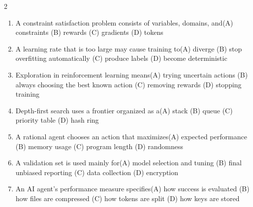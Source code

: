 \documentclass[a4paper]{article}
\begin{document}
\begin{multicols*}{2}
\begin{enumerate}
\item A constraint satisfaction problem consists of variables, domains, and\newline\hspace*{0.6em}(A) constraints \quad (B) rewards \newline\hspace*{0.6em}(C) gradients \quad (D) tokens
\item A learning rate that is too large may cause training to\newline\hspace*{0.6em}(A) diverge \quad (B) stop overfitting automatically \newline\hspace*{0.6em}(C) produce labels \quad (D) become deterministic
\item Exploration in reinforcement learning means\newline\hspace*{0.6em}(A) trying uncertain actions \quad (B) always choosing the best known action \newline\hspace*{0.6em}(C) removing rewards \quad (D) stopping training
\item Depth-first search uses a frontier organized as a\newline\hspace*{0.6em}(A) stack \quad (B) queue \newline\hspace*{0.6em}(C) priority table \quad (D) hash ring
\item A rational agent chooses an action that maximizes\newline\hspace*{0.6em}(A) expected performance \quad (B) memory usage \newline\hspace*{0.6em}(C) program length \quad (D) randomness
\item A validation set is used mainly for\newline\hspace*{0.6em}(A) model selection and tuning \quad (B) final unbiased reporting \newline\hspace*{0.6em}(C) data collection \quad (D) encryption
\item An AI agent's performance measure specifies\newline\hspace*{0.6em}(A) how success is evaluated \quad (B) how files are compressed \newline\hspace*{0.6em}(C) how tokens are split \quad (D) how keys are stored

\end{enumerate}
\end{multicols*}
\end{document}
